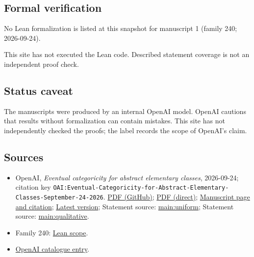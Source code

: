 \documentclass[11pt]{article}
\begin{document}
\subsection{Formal verification}
No Lean formalization is listed at this snapshot for manuscript 1 (family 240; 2026-09-24).

This site has not executed the Lean code. Described statement coverage is not an independent proof check.

\subsection{Status caveat}
The manuscripts were produced by an internal OpenAI model. OpenAI cautions that results without formalization can contain mistakes. This site has not independently checked the proofs; the label records the scope of OpenAI's claim.

\subsection{Sources}
\begin{itemize}
\item OpenAI, \emph{Eventual categoricity for abstract elementary classes}, 2026-09-24; citation key \texttt{OAI:Eventual-Categoricity-for-Abstract-Elementary-Classes-September-24-2026}. \href{https://github.com/openai/math/blob/adc7f1241b42e322a6451854ab7e4b4c146bf78a/preprints/Eventual-Categoricity-for-Abstract-Elementary-Classes-September-24-2026/paper.pdf}{PDF (GitHub)}; \href{https://github.com/openai/math/raw/adc7f1241b42e322a6451854ab7e4b4c146bf78a/preprints/Eventual-Categoricity-for-Abstract-Elementary-Classes-September-24-2026/paper.pdf}{PDF (direct)}; \href{https://github.com/openai/math/blob/adc7f1241b42e322a6451854ab7e4b4c146bf78a/preprints/Eventual-Categoricity-for-Abstract-Elementary-Classes-September-24-2026/README.md}{Manuscript page and citation}; \href{https://github.com/openai/math/blob/main/preprints/Eventual-Categoricity-for-Abstract-Elementary-Classes-September-24-2026/paper.pdf}{Latest version}; Statement source: \href{https://github.com/openai/math/blob/adc7f1241b42e322a6451854ab7e4b4c146bf78a/preprints/Eventual-Categoricity-for-Abstract-Elementary-Classes-September-24-2026/build/sections/01-introduction.tex\#L45}{main:uniform}; Statement source: \href{https://github.com/openai/math/blob/adc7f1241b42e322a6451854ab7e4b4c146bf78a/preprints/Eventual-Categoricity-for-Abstract-Elementary-Classes-September-24-2026/build/sections/01-introduction.tex\#L75}{main:qualitative}.
\item Family 240: \href{https://github.com/openai/math/blob/adc7f1241b42e322a6451854ab7e4b4c146bf78a/lean/docs/240.md}{Lean scope}.
\item \href{https://github.com/openai/math/blob/adc7f1241b42e322a6451854ab7e4b4c146bf78a/CONTENTS.md}{OpenAI catalogue entry}.
\end{itemize}
\end{document}
